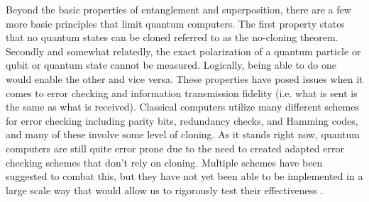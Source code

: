    Beyond the basic properties of entanglement and superposition, there are a few more basic principles that limit quantum computers. The first property states that no quantum states can be cloned referred to as the no-cloning theorem. Secondly and somewhat relatedly, the exact polarization of a quantum particle or qubit or quantum state cannot be measured. Logically, being able to do one would enable the other and vice versa. These properties have posed issues when it comes to error checking and information transmission fidelity (i.e. what is sent is the same as what is received). Classical computers utilize many different schemes for error checking including parity bits, redundancy checks, and Hamming codes, and many of these involve some level of cloning. As it stands right now, quantum computers are still quite error prone due to the need to created adapted error checking schemes that don't rely on cloning. Multiple schemes have been suggested to combat this, but they have not yet been able to be implemented in a large scale way that would allow us to rigorously test their effectiveness \cite{shor}.









